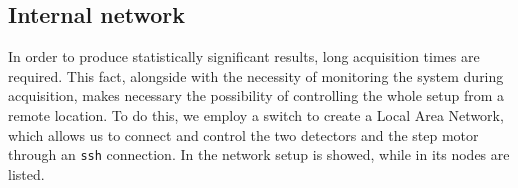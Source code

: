 \documentclass[../../main/main.tex]{subfiles}
\begin{document}
\subsection{Internal network}
In order to produce statistically significant results, long acquisition times are required.
This fact, alongside with the necessity of monitoring the system during acquisition, makes necessary the possibility of controlling the whole setup from a remote location. To do this, we employ a switch to create a Local Area Network, which allows us to connect and control the two detectors and the step motor through an \texttt{ssh} connection. In  the network setup is showed, while in   its nodes are listed.


\begin{figure}[h]
    \begin{minipage}[c]{0.49\linewidth}
        \vspace{0pt}
        \centering
    \end{minipage}%
    \hfill%
    \begin{minipage}[c]{0.49\linewidth}
        \vspace{0pt}
        \centering
\end{minipage}
\end{figure}
\end{document}
